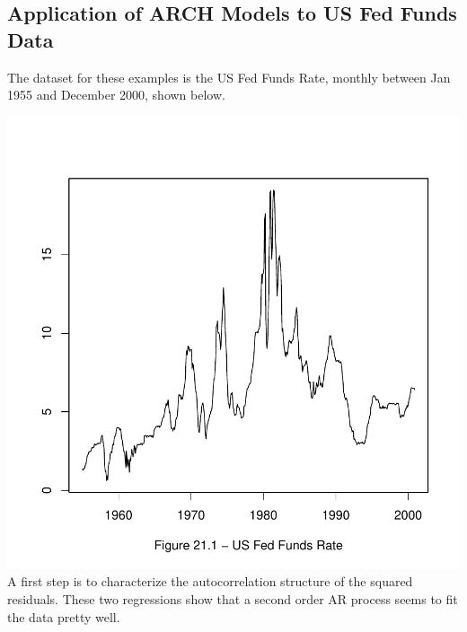 \documentclass[a4paper]{article}
\renewcommand{\~}{\perispomeni}%
\begin{document}
\subsection{Application of ARCH Models to US Fed Funds Data}
The dataset for these examples is the US Fed Funds Rate, monthly between Jan 1955 and December 2000,
shown below.
\begin{Schunk}
\end{Schunk}
\includegraphics{Companion-091}
A first step is to characterize the autocorrelation structure of the squared residuals.  These two regressions
show that a second order AR process seems to fit the data pretty well.
\end{document}
